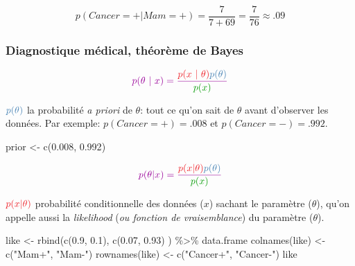 \documentclass[
  a4paper,11pt,twoside,onecolumn,openright,final,oldfontcommands]{memoir}
\newenvironment{Shaded}{\begin{snugshade}}{\end{snugshade}}
\newcommand{\FloatTok}[1]{\textcolor[rgb]{0.00,0.00,0.81}{#1}}
\newcommand{\FunctionTok}[1]{\textcolor[rgb]{0.00,0.00,0.00}{#1}}
\newcommand{\NormalTok}[1]{#1}
\newcommand{\OtherTok}[1]{\textcolor[rgb]{0.56,0.35,0.01}{#1}}
\newcommand{\SpecialCharTok}[1]{\textcolor[rgb]{0.00,0.00,0.00}{#1}}
\newcommand{\StringTok}[1]{\textcolor[rgb]{0.31,0.60,0.02}{#1}}
\theoremstyle{definition}
\theoremstyle{definition}
\theoremstyle{definition}
\theoremstyle{definition}
\theoremstyle{remark}
\begin{document}
\[ p(Cancer = + | Mam = +) = \frac{7}{7 + 69} = \frac{7}{76} \approx .09\]

\hypertarget{diagnostique-muxe9dical-thuxe9oruxe8me-de-bayes}{%
\subsubsection{Diagnostique médical, théorème de Bayes}\label{diagnostique-muxe9dical-thuxe9oruxe8me-de-bayes}}

\[
\color{purple}{p(\theta \ | \ x)} = \dfrac{\color{orangered}{p(x \ | \ \theta)} \color{steelblue}{p(\theta)}}{\color{green}{p(x)}}
\]

\(\color{steelblue}{p(\theta)}\) { la probabilité \emph{a priori} de \(\theta\): tout ce qu'on sait de \(\theta\) avant d'observer les données. Par exemple: \(p(Cancer=+)=.008\) et \(p(Cancer=-)=.992\).}

\begin{Shaded}
\begin{Highlighting}[]
\NormalTok{prior }\OtherTok{\textless{}{-}} \FunctionTok{c}\NormalTok{(}\FloatTok{0.008}\NormalTok{, }\FloatTok{0.992}\NormalTok{)}
\end{Highlighting}
\end{Shaded}

\[
\color{purple}{p(\theta \vert x)} = \dfrac{\color{orangered}{p(x\vert \theta)} \color{steelblue}{p(\theta)}}{\color{green}{p(x)}}
\]

\(\color{orangered}{p(x\vert \theta)}\) { probabilité conditionnelle des données (\(x\)) sachant le paramètre (\(\theta\)), qu'on appelle aussi la \emph{likelihood} (\emph{ou fonction de vraisemblance}) du paramètre (\(\theta\)).}

\begin{Shaded}
\begin{Highlighting}[]
\NormalTok{like }\OtherTok{\textless{}{-}} \FunctionTok{rbind}\NormalTok{(}\FunctionTok{c}\NormalTok{(}\FloatTok{0.9}\NormalTok{, }\FloatTok{0.1}\NormalTok{), }\FunctionTok{c}\NormalTok{(}\FloatTok{0.07}\NormalTok{, }\FloatTok{0.93}\NormalTok{) ) }\SpecialCharTok{\%\textgreater{}\%}\NormalTok{ data.frame}
\FunctionTok{colnames}\NormalTok{(like) }\OtherTok{\textless{}{-}} \FunctionTok{c}\NormalTok{(}\StringTok{"Mam+"}\NormalTok{, }\StringTok{"Mam{-}"}\NormalTok{)}
\FunctionTok{rownames}\NormalTok{(like) }\OtherTok{\textless{}{-}} \FunctionTok{c}\NormalTok{(}\StringTok{"Cancer+"}\NormalTok{, }\StringTok{"Cancer{-}"}\NormalTok{)}
\NormalTok{like}
\end{Highlighting}
\end{Shaded}
\end{document}
